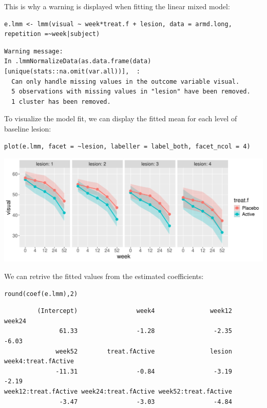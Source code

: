 \documentclass[12pt]{article}
\begin{document}
This is why a warning is displayed when fitting the linear mixed
model:
\lstset{language=r,label= ,caption= ,captionpos=b,numbers=none}
\begin{lstlisting}
e.lmm <- lmm(visual ~ week*treat.f + lesion, data = armd.long, repetition =~week|subject)
\end{lstlisting}

\begin{verbatim}
Warning message:
In .lmmNormalizeData(as.data.frame(data)[unique(stats::na.omit(var.all))],  :
  Can only handle missing values in the outcome variable visual. 
  5 observations with missing values in "lesion" have been removed. 
  1 cluster has been removed.
\end{verbatim}


To visualize the model fit, we can display the fitted mean for each
level of baseline lesion:
\lstset{language=r,label= ,caption= ,captionpos=b,numbers=none}
\begin{lstlisting}
plot(e.lmm, facet = ~lesion, labeller = label_both, facet_ncol = 4)
\end{lstlisting}

\begin{center}
\includegraphics[trim={0 0 0 0},width=\textwidth]{./figures/gg-lmmfit.pdf}
\end{center}


We can retrive the fitted values from the estimated coefficients:
\lstset{language=r,label= ,caption= ,captionpos=b,numbers=none}
\begin{lstlisting}
round(coef(e.lmm),2)
\end{lstlisting}

\begin{verbatim}
         (Intercept)                week4               week12               week24 
               61.33                -1.28                -2.35                -6.03 
              week52        treat.fActive               lesion  week4:treat.fActive 
              -11.31                -0.84                -3.19                -2.19 
week12:treat.fActive week24:treat.fActive week52:treat.fActive 
               -3.47                -3.03                -4.84
\end{verbatim}
\end{document}
